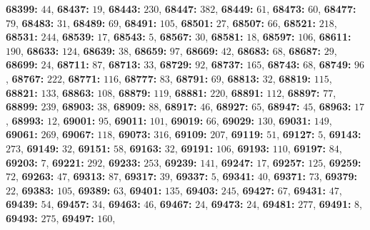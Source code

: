 \textsf{\bfseries 68399:} $44$, \textsf{\bfseries 68437:} $19$, \textsf{\bfseries 68443:} $230$, \textsf{\bfseries 68447:} $382$, \textsf{\bfseries 68449:} $61$, \textsf{\bfseries 68473:} $60$, \textsf{\bfseries 68477:} $79$, \textsf{\bfseries 68483:} $31$, \textsf{\bfseries 68489:} $69$, \textsf{\bfseries 68491:} $105$, \textsf{\bfseries 68501:} $27$, \textsf{\bfseries 68507:} $66$, \textsf{\bfseries 68521:} $218$, \textsf{\bfseries 68531:} $244$, \textsf{\bfseries 68539:} $17$, \textsf{\bfseries 68543:} $5$, \textsf{\bfseries 68567:} $30$, \textsf{\bfseries 68581:} $18$, \textsf{\bfseries 68597:} $106$, \textsf{\bfseries 68611:} $190$, \textsf{\bfseries 68633:} $124$, \textsf{\bfseries 68639:} $38$, \textsf{\bfseries 68659:} $97$, \textsf{\bfseries 68669:} $42$, \textsf{\bfseries 68683:} $68$, \textsf{\bfseries 68687:} $29$, \textsf{\bfseries 68699:} $24$, \textsf{\bfseries 68711:} $87$, \textsf{\bfseries 68713:} $33$, \textsf{\bfseries 68729:} $92$, \textsf{\bfseries 68737:} $165$, \textsf{\bfseries 68743:} $68$, \textsf{\bfseries 68749:} $96$, \textsf{\bfseries 68767:} $222$, \textsf{\bfseries 68771:} $116$, \textsf{\bfseries 68777:} $83$, \textsf{\bfseries 68791:} $69$, \textsf{\bfseries 68813:} $32$, \textsf{\bfseries 68819:} $115$, \textsf{\bfseries 68821:} $133$, \textsf{\bfseries 68863:} $108$, \textsf{\bfseries 68879:} $119$, \textsf{\bfseries 68881:} $220$, \textsf{\bfseries 68891:} $112$, \textsf{\bfseries 68897:} $77$, \textsf{\bfseries 68899:} $239$, \textsf{\bfseries 68903:} $38$, \textsf{\bfseries 68909:} $88$, \textsf{\bfseries 68917:} $46$, \textsf{\bfseries 68927:} $65$, \textsf{\bfseries 68947:} $45$, \textsf{\bfseries 68963:} $17$, \textsf{\bfseries 68993:} $12$, \textsf{\bfseries 69001:} $95$, \textsf{\bfseries 69011:} $101$, \textsf{\bfseries 69019:} $66$, \textsf{\bfseries 69029:} $130$, \textsf{\bfseries 69031:} $149$, \textsf{\bfseries 69061:} $269$, \textsf{\bfseries 69067:} $118$, \textsf{\bfseries 69073:} $316$, \textsf{\bfseries 69109:} $207$, \textsf{\bfseries 69119:} $51$, \textsf{\bfseries 69127:} $5$, \textsf{\bfseries 69143:} $273$, \textsf{\bfseries 69149:} $32$, \textsf{\bfseries 69151:} $58$, \textsf{\bfseries 69163:} $32$, \textsf{\bfseries 69191:} $106$, \textsf{\bfseries 69193:} $110$, \textsf{\bfseries 69197:} $84$, \textsf{\bfseries 69203:} $7$, \textsf{\bfseries 69221:} $292$, \textsf{\bfseries 69233:} $253$, \textsf{\bfseries 69239:} $141$, \textsf{\bfseries 69247:} $17$, \textsf{\bfseries 69257:} $125$, \textsf{\bfseries 69259:} $72$, \textsf{\bfseries 69263:} $47$, \textsf{\bfseries 69313:} $87$, \textsf{\bfseries 69317:} $39$, \textsf{\bfseries 69337:} $5$, \textsf{\bfseries 69341:} $40$, \textsf{\bfseries 69371:} $73$, \textsf{\bfseries 69379:} $22$, \textsf{\bfseries 69383:} $105$, \textsf{\bfseries 69389:} $63$, \textsf{\bfseries 69401:} $135$, \textsf{\bfseries 69403:} $245$, \textsf{\bfseries 69427:} $67$, \textsf{\bfseries 69431:} $47$, \textsf{\bfseries 69439:} $54$, \textsf{\bfseries 69457:} $34$, \textsf{\bfseries 69463:} $46$, \textsf{\bfseries 69467:} $24$, \textsf{\bfseries 69473:} $24$, \textsf{\bfseries 69481:} $277$, \textsf{\bfseries 69491:} $8$, \textsf{\bfseries 69493:} $275$, \textsf{\bfseries 69497:} $160$, 
